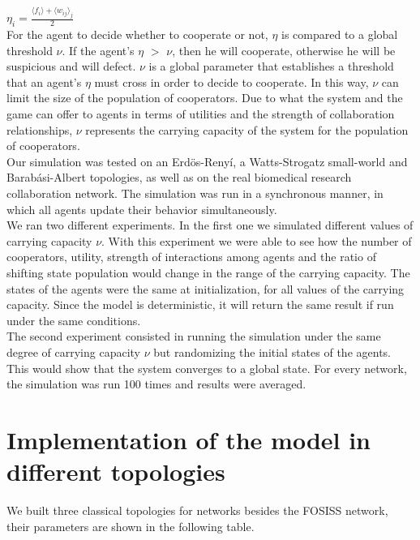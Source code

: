 \documentclass{bmcart}
\begin{document}
$\eta_i = \frac{\langle f_i \rangle + \langle w_{ij} \rangle _j}{2}$\\

For the agent to decide whether to cooperate or not, $\eta$ is
compared to a global threshold $\nu$. If the agent's $\eta$ $>$ $\nu$,
then he will cooperate, otherwise he will be suspicious and
will defect. $\nu$ is a global parameter that establishes a threshold
that an agent's $\eta$ must cross in order to decide to cooperate. In
this way, $\nu$ can limit the size of the population of
cooperators. Due to what the system and the game can offer to agents
in terms of utilities and the strength of collaboration relationships,
$\nu$ represents the carrying capacity of the
system for the population of cooperators.\\


Our simulation was tested on an Erd\"{o}s-Reny\'i, a
Watts-Strogatz small-world and Barab\'asi-Albert topologies, as well
as on the real biomedical research collaboration network. The
simulation was run in a synchronous manner, in which all agents update their
behavior simultaneously. \\   

We ran two different experiments. In the first one we simulated different
values of carrying capacity $\nu$. With this experiment we were able
to see how the number of cooperators, utility, strength of interactions
among agents and the ratio of shifting state population would change
in the range of the carrying capacity. The states of the agents were
the same at initialization, for all values of the carrying
capacity. Since the model is deterministic, it will return the same
result if run under the same conditions.\\

The second experiment consisted in running the simulation under the
same degree of carrying capacity $\nu$ but randomizing the initial
states of the agents. This would show that the system converges to a
global state. For every network, the simulation was run 100 times and
results were averaged.

\section*{Implementation of the model in different topologies}

We built three classical topologies for networks besides the FOSISS network, their parameters are shown in the following table.\\
\end{document}
